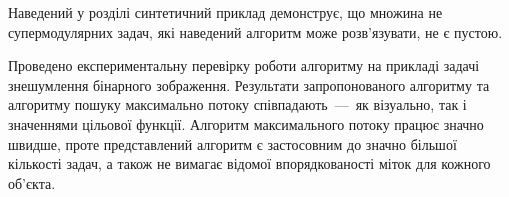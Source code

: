 \chapterConclusion

Наведений у розділі синтетичний приклад демонструє, що множина
не супермодулярних задач, які наведений
алгоритм може розв’язувати, не є пустою.

Проведено експериментальну перевірку роботи алгоритму
на прикладі задачі знешумлення бінарного
зображення. Результати запропонованого алгоритму та
алгоритму пошуку максимально потоку співпадають~---~як візуально,
так і значеннями цільової функції.
Алгоритм максимального потоку працює значно швидше, проте представлений
алгоритм є застосовним до значно більшої кількості задач, а також не вимагає
відомої впорядкованості міток для кожного об'єкта.
